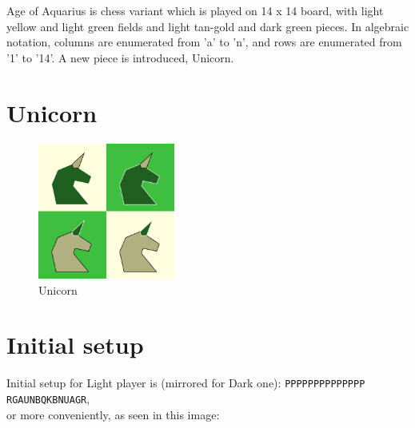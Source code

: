 \documentclass[a5paper,12pt,draft]{book} %
\begin{document}
Age of Aquarius is chess variant which is played on 14 x 14 board,
with light yellow and light green fields and light tan-gold and
dark green pieces. In algebraic notation, columns are enumerated
from 'a' to 'n', and rows are enumerated from '1' to '14'. A new
piece is introduced, Unicorn.

\clearpage

\section*{Unicorn}

\noindent
\begin{figure}
\includegraphics[width=0.4\textwidth, keepaspectratio=true]{../gfx/pieces/09_unicorn.png}
\caption{Unicorn}
\label{fig:unicorn}
\end{figure}

\clearpage

\section*{Initial setup}

Initial setup for Light player is (mirrored for Dark one):
\texttt{PPPPPPPPPPPPPP \\
        RGAUNBQKBNUAGR}, \\
or more conveniently, as seen in this image:
\end{document}
